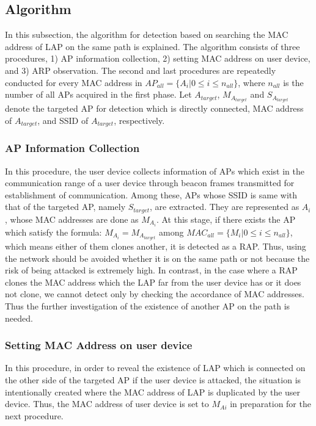 \documentclass[conference]{IEEEtran}
\begin{document}
\subsection{Algorithm}
In this subsection, the algorithm for detection based on searching the MAC address of LAP on the same path is explained.
The algorithm consists of three procedures, 1) AP information collection, 2) setting MAC address on user device, and 3) ARP observation.
The second and last procedures are repeatedly conducted for every MAC address in  $AP_{all}=\{A_i|0\le i \le n_{all}\}$, where $n_{all}$ is the number of all APs acquired in the first   phase.
Let $A_{target}$, $M_{A_{target}}$ and $S_{A_{target}}$ denote the targeted AP for detection which is directly connected, MAC address of $A_{target}$, and SSID of $A_{target}$, respectively.

\subsubsection{AP Information Collection}
In this procedure, the user device collects information of APs which exist in the communication range of a user device through beacon frames transmitted for establishment of communication.
Among these, APs whose SSID is same with that of the targeted AP, namely $S_{target}$, are extracted.
They are represented as $A_i$, whose MAC addresses are done as $M_{A_i}$.
At this stage, if there exists the AP which satisfy the formula: $M_{A_i} = M_{A_{target}}$  among $MAC_{all}=\{M_i|0 \le i \le n_{all}\}$, which means either of them clones another, it is detected as a RAP.
Thus, using the network should be avoided whether it is on the same path or not because the risk of being attacked is extremely high. 
In contrast, in the case where a RAP clones the MAC address which the LAP far from the user device has or it does not clone, we cannot detect only by checking the accordance of MAC addresses.
Thus the further investigation of the existence of another AP on the path is needed.

\subsubsection{Setting MAC Address on user device}
In this procedure, in order to reveal the existence of LAP which is connected on the other side of the targeted AP if  the user device is attacked, the situation is intentionally created where the MAC address of LAP is duplicated by the user device.
Thus, the MAC address of user device is set to $M_{Ai}$ in preparation for the next procedure.
\end{document}
